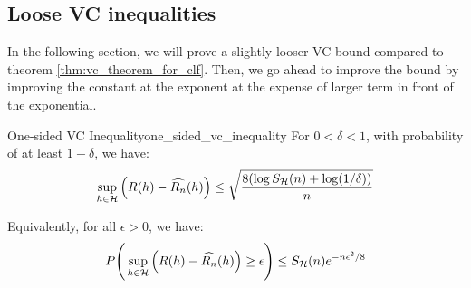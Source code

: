 \subsection{Loose VC inequalities}
\label{sec:proof_of_vc_inequality}

In the following section, we will prove a slightly looser VC bound compared to theorem \ref{thm:vc_theorem_for_clf}. Then, we go ahead to improve the bound by improving the constant at the exponent at the expense of larger term in front of the exponential.

\begin{theorem}{One-sided VC Inequality}{one_sided_vc_inequality}
    For $0 < \delta < 1$, with probability of at least $1-\delta$, we have:
    \begin{align*}
        \sup_{h\in\mathcal{H}} \Big( 
            R(h) - \widehat{R_n}(h)
         \Big) \le \sqrt{
            \frac{8(\log S_{\mathcal{H}}(n) + \log(1/\delta))}{n}
        }
    \end{align*}

    \noindent Equivalently, for all $\epsilon>0$, we have:
    \begin{align*}
        P\Bigg( 
            \sup_{h\in\mathcal{H}} \Big( 
                R(h) - \widehat{R_n}(h)
             \Big) \ge \epsilon
         \Bigg) \le S_{\mathcal{H}}(n)e^{-n\epsilon^2/8}
    \end{align*}
\end{theorem}

